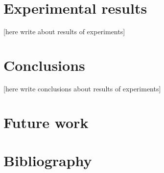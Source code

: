\documentclass{article}
\begin{document}
\section{Experimental results}
[here write about results of experiments]
\section{Conclusions}
[here write conclusions about results of experiments]

\section{Future work}
\section{Bibliography}
\end{document}
